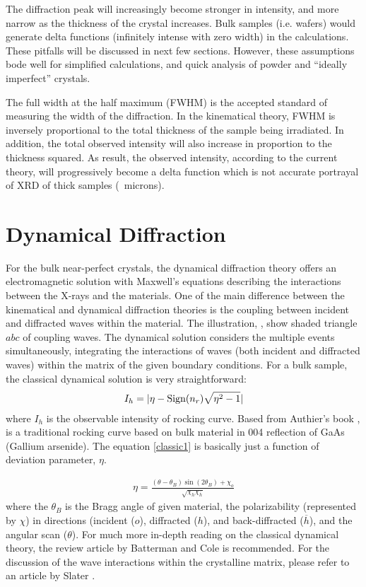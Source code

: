 The diffraction peak will increasingly become stronger in intensity, and more narrow as the thickness of the crystal increases.  Bulk samples (i.e. wafers) would generate delta functions (infinitely intense with zero width) in the calculations.  These pitfalls will be discussed in next few sections.  However, these assumptions bode well for simplified calculations, and quick analysis of powder and ``ideally imperfect'' crystals.

The full width at the half maximum (FWHM) is the accepted standard of measuring the width of the diffraction.  In the kinematical theory, FWHM is inversely proportional to the total thickness of the sample being irradiated.  In addition, the total observed intensity will also increase in proportion to the thickness squared.  As result,  the observed intensity, according to the current theory, will progressively become a delta function which is not accurate portrayal of XRD of thick samples (~microns).


	\section{Dynamical Diffraction}

For the bulk near-perfect crystals, the dynamical diffraction theory offers an electromagnetic solution with Maxwell's equations describing the interactions between the X-rays and the materials. One of the main difference between the kinematical and dynamical diffraction theories is the coupling between incident and diffracted waves within the material.  The illustration,  , show shaded triangle $abc$ of coupling waves.  The dynamical solution considers the multiple events simultaneously, integrating the interactions of waves (both incident and diffracted waves) within the matrix of the given boundary conditions.  For a bulk sample, the classical dynamical solution is very straightforward:
\begin{align}
I_h = \lvert\eta - \text{Sign}(n_r)\sqrt{\eta^2 - 1}\rvert\label{classic1}
\end{align}
where $I_h$ is the observable intensity of rocking curve. Based from Authier's book \cite{Authier1},  is a traditional rocking curve based on bulk material in 004 reflection of GaAs (Gallium arsenide).  The equation \ref{classic1} is basically just a function of deviation parameter, $\eta$.

\begin{align}
\eta = \frac{(\theta -\theta_B) \sin (2\theta_B) + \chi_o}{\sqrt{\chi_h \chi_{\overline h}}}
\end{align}
 where the $\theta_B$ is the Bragg angle of given material, the polarizability (represented by $\chi$) in directions (incident ($o$), diffracted ($h$), and back-diffracted ($\overline h$), and the angular scan ($\theta$).  For much more in-depth reading on the classical dynamical theory, the review article  by Batterman and Cole \cite{Batterman1} is recommended. For the discussion of the wave interactions within the crystalline matrix, please refer to an article by Slater \cite{Slater1}.


